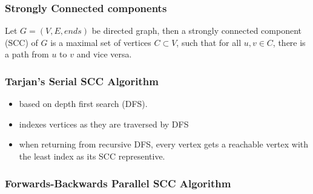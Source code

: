 \documentclass[18pt]{beamer}
\begin{document}
  \begin{frame}
    \frametitle{Strongly Connected components}
    
    \begin{definition}
    Let $G=(V, E, ends)$ be directed graph, then a strongly connected component (SCC) of $G$ is a maximal set of vertices $C\subset V$, such that for all $u,v \in C$, there is a path from $u$ to $v$  and vice versa.
    \end{definition}
    
\SetVertexNormal[Shape      = circle,
                 FillColor  = blue!20,
                 LineWidth  = 2pt]
\SetUpEdge[lw         = 3pt,
           color      = black,
           labelcolor = white,
           labeltext  = red,
           labelstyle = {sloped,draw,text=blue}]
\begin{center}
\end{center}    
    
  \end{frame}
  
  \begin{frame}
  \frametitle{Tarjan's Serial SCC Algorithm}
  
    \begin{itemize}
      \item based on depth first search (DFS).
      \item indexes vertices as they are traversed by DFS
      \item when returning from recursive DFS, every vertex gets a reachable vertex with the least index as its SCC representive.
    \end{itemize}  
  \end{frame}  
  
  \begin{frame}
    \frametitle{Forwards-Backwards Parallel SCC Algorithm}
      
    
    \lstI
    
  \end{frame}
  
\end{document}
